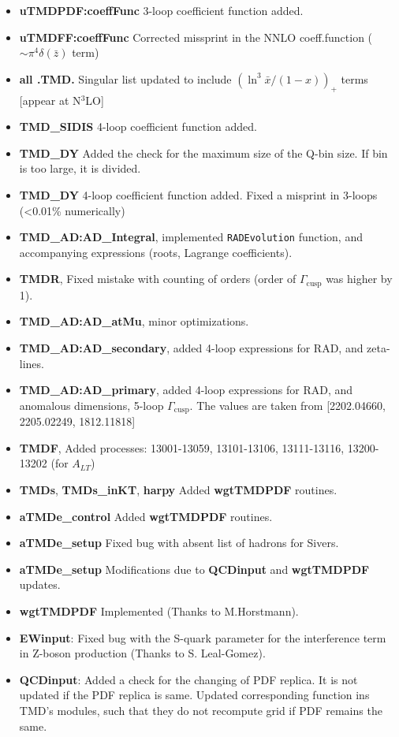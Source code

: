 \documentclass[prd,nofootinbib,eqsecnum,final]{revtex4}
\renewcommand{\(}{\left(}
\renewcommand{\)}{\right)}
\renewcommand{\[}{\left[}
\renewcommand{\]}{\right]}
\begin{document}
\begin{itemize}
\begin{itemize}
	\item \textbf{uTMDPDF:coeffFunc} 3-loop coefficient function added.
	\item \textbf{uTMDFF:coeffFunc} Corrected missprint in the NNLO coeff.function ($\sim\pi^4\delta(\bar z)$ term)  
	\item \textbf{all .TMD.} Singular list updated to include $(\ln^3\bar x/(1-x))_+$ terms [appear at N$^3$LO]
	\item \textbf{TMD\_SIDIS} 4-loop coefficient function added. 
	\item \textbf{TMD\_DY} Added the check for the maximum size of the Q-bin size. If bin is too large, it is divided.
	\item \textbf{TMD\_DY} 4-loop coefficient function added. Fixed a misprint in 3-loops (<0.01\% numerically)
	\item \textbf{TMD\_AD:AD\_Integral}, implemented \texttt{RADEvolution} function, and accompanying expressions (roots, Lagrange coefficients).
	\item \textbf{TMDR}, Fixed mistake with counting of orders (order of $\Gamma_{\text{cusp}}$ was higher by 1).
	\item \textbf{TMD\_AD:AD\_atMu}, minor optimizations.
	\item \textbf{TMD\_AD:AD\_secondary}, added 4-loop expressions for RAD, and zeta-lines.
	\item \textbf{TMD\_AD:AD\_primary}, added 4-loop expressions for RAD, and anomalous dimensions, 5-loop $\Gamma_{\text{cusp}}$. The values are taken from [2202.04660, 2205.02249, 1812.11818]
	\item \textbf{TMDF}, Added processes: 13001-13059, 13101-13106, 13111-13116, 13200-13202 (for $A_{LT}$)
	\item \textbf{TMDs}, \textbf{TMDs\_inKT}, \textbf{harpy} Added \textbf{wgtTMDPDF} routines.
	\item \textbf{aTMDe\_control} Added \textbf{wgtTMDPDF} routines.
	\item \textbf{aTMDe\_setup} Fixed bug with absent list of hadrons for Sivers.
	\item \textbf{aTMDe\_setup} Modifications due to \textbf{QCDinput} and \textbf{wgtTMDPDF} updates.
	\item \textbf{wgtTMDPDF} Implemented (Thanks to M.Horstmann).
	\item \textbf{EWinput}: Fixed bug with the S-quark parameter for the interference term in Z-boson production (Thanks to S. Leal-Gomez).
	\item \textbf{QCDinput}: Added a check for the changing of PDF replica. It is not updated if the PDF replica is same. Updated corresponding function ins TMD's modules, such that they do not recompute grid if PDF remains the same.

\end{itemize}
\end{itemize}
\end{document}
